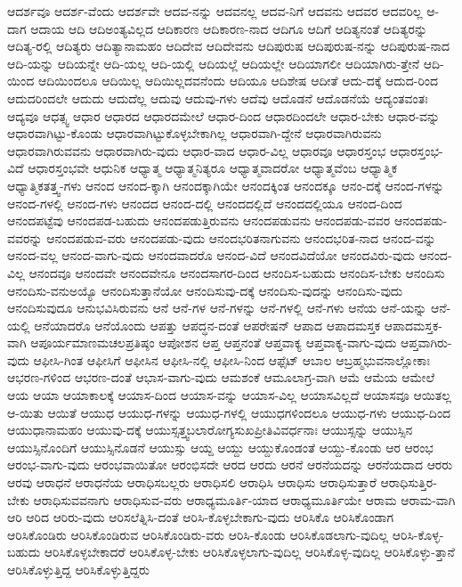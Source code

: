 {ಆದರ್ಶವೂ
ಆದರ್ಶ-ವೆಂದು
ಆದರ್ಶವೇ
ಆದವ-ನನ್ನು
ಆದವನಲ್ಲ
ಆದವ-ನಿಗೆ
ಆದವನು
ಆದವರ
ಆದವರಿಲ್ಲ
ಆ-ದಾಗ
ಆದಾಯ
ಆದಿ
ಆದಿಅಂತ್ಯವಿಲ್ಲದ
ಆದಿಕಾರಣ
ಆದಿಕಾರಣ-ನಾದ
ಆದಿಗೂ
ಆದಿಗೆ
ಆದಿತ್ಯನಂತೆ
ಆದಿತ್ಯರನ್ನು
ಆದಿತ್ಯ-ರಲ್ಲಿ
ಆದಿತ್ಯರು
ಆದಿತ್ಯಾನಾಮಹಂ
ಆದಿದೇವ
ಆದಿದೇವನು
ಆದಿಪುರುಷ
ಆದಿಪುರುಷ-ನನ್ನು
ಆದಿಪುರುಷ-ನಾದ
ಆದಿ-ಯನ್ನು
ಆದಿಯನ್ನೇ
ಆದಿ-ಯಲ್ಲ
ಆದಿ-ಯಲ್ಲಿ
ಆದಿಯಲ್ಲೆ
ಆದಿಯಲ್ಲೇ
ಆದಿಯಾಗಲೀ
ಆದಿಯಾಗಿರು-ತ್ತೇನೆ
ಆದಿ-ಯಿಂದ
ಆದಿಯಿಂದಲೂ
ಆದಿಯಿಲ್ಲ
ಆದಿಯಿಲ್ಲದವನೆಂದು
ಆದಿಯೂ
ಆದಿಶೇಷ
ಆದೀತೆ
ಆದು-ದಕ್ಕೆ
ಆದುದ-ರಿಂದ
ಆದುದರಿಂದಲೇ
ಆದುದು
ಆದುದೆಲ್ಲ
ಆದುವು
ಆದುವು-ಗಳು
ಆದೆವು
ಆದೊಡನೆ
ಆದೊಡನೆಯೆ
ಆದ್ಯಂತವಂತಃ
ಆದ್ಯವೂ
ಆಧತ್ಸ್ವ
ಆಧಾರ
ಆಧಾರದ
ಆಧಾರದಮೇಲೆ
ಆಧಾರ-ದಿಂದ
ಆಧಾರದಿಂದಲೇ
ಆಧಾರ-ಬೇಕು
ಆಧಾರ-ವನ್ನು
ಆಧಾರವಾಗಿಟ್ಟು-ಕೊಂಡು
ಆಧಾರವಾಗಿಟ್ಟುಕೊಳ್ಳಬೇಕಾಗಿಲ್ಲ
ಆಧಾರವಾಗಿ-ದ್ದೇನೆ
ಆಧಾರವಾಗಿರುವನು
ಆಧಾರವಾಗಿರುವವನು
ಆಧಾರವಾಗಿರು-ವುದು
ಆಧಾರ-ವಾದ
ಆಧಾರ-ವಿಲ್ಲ
ಆಧಾರವೂ
ಆಧಾರಸ್ತಂಭ
ಆಧಾರಸ್ತಂಭ-ವಿದೆ
ಆಧಾರಸ್ತಂಭವೇ
ಆಧುನಿಕ
ಆಧ್ಯಾತ್ಮ
ಆಧ್ಯಾತ್ಮನಿತ್ಯರೂ
ಆಧ್ಯಾತ್ಮವಾದರೋ
ಆಧ್ಯಾತ್ಮವೆಂಬ
ಆಧ್ಯಾತ್ಮಿಕ
ಆಧ್ಯಾತ್ಮಿಕತತ್ತ್ವ-ಗಳು
ಆನಂದ
ಆನಂದ-ಕ್ಕಾಗಿ
ಆನಂದಕ್ಕಾಗಿಯೇ
ಆನಂದಕ್ಕಿಂತ
ಆನಂದಕ್ಕೂ
ಆನಂ-ದಕ್ಕೆ
ಆನಂದ-ಗಳನ್ನು
ಆನಂದ-ಗಳಲ್ಲಿ
ಆನಂದ-ಗಳು
ಆನಂದದ
ಆನಂದ-ದಲ್ಲಿ
ಆನಂದದಲ್ಲಿದೆ
ಆನಂದದಲ್ಲಿಯೂ
ಆನಂದ-ದಿಂದ
ಆನಂದಪಟ್ಟೆವು
ಆನಂದಪಡ-ಬಹುದು
ಆನಂದಪಡುತ್ತಿರುವನು
ಆನಂದಪಡುವನು
ಆನಂದಪಡು-ವವರ
ಆನಂದಪಡು-ವವರನ್ನು
ಆನಂದಪಡುವ-ವರು
ಆನಂದಪಡು-ವುದು
ಆನಂದಭರಿತನಾಗುವನು
ಆನಂದಭರಿತ-ನಾದ
ಆನಂದ-ವನ್ನು
ಆನಂದ-ವಲ್ಲ
ಆನಂದ-ವಾಗು-ವುದು
ಆನಂದವಾದರೊ
ಆನಂದ-ವಿದೆ
ಆನಂದವಿದೆಯೋ
ಆನಂದವಿರು-ವುದು
ಆನಂದ-ವಿಲ್ಲ
ಆನಂದವೂ
ಆನಂದವೇ
ಆನಂದವೇನೂ
ಆನಂದಸಾಗರ-ದಿಂದ
ಆನಂದಿಸ-ಬಹುದು
ಆನಂದಿಸ-ಬೇಕು
ಆನಂದಿಸು
ಆನಂದಿಸು-ವನುಅಯ್ಯೊ
ಆನಂದಿಸುತ್ತಾನೆಯೋ
ಆನಂದಿಸುವು-ದಕ್ಕೆ
ಆನಂದಿಸು-ವುದನ್ನು
ಆನಂದಿಸು-ವುದು
ಆನಂದಿಸುವುದೂ
ಆನುಭವಿಸಿರುವನು
ಆನೆ
ಆನೆ-ಗಳ
ಆನೆ-ಗಳನ್ನು
ಆನೆ-ಗಳಲ್ಲಿ
ಆನೆ-ಗಳು
ಆನೆಯ
ಆನೆ-ಯನ್ನು
ಆನೆ-ಯಲ್ಲಿ
ಆನೆಯಾದರೊ
ಆನೆಯೊಂದು
ಆಪತ್ತು
ಆಪದ್ಧನ-ದಂತೆ
ಆಪರೇಷನ್
ಆಪಾದ
ಆಪಾದಮಸ್ತಕ
ಆಪಾದಮಸ್ತಕ-ವಾಗಿ
ಆಪೂರ್ಯಮಾಣಮಚಲಪ್ರತಿಷ್ಠಂ
ಆಪೋಶನ
ಆಪ್ತ
ಆಪ್ತನಂತೆ
ಆಪ್ತವಾಕ್ಯ
ಆಪ್ತವಾಕ್ಯ-ವಾಗು-ವುದು
ಆಪ್ತವಾಗಿರು-ವುದು
ಆಫೀಸಿ-ಗಿಂತ
ಆಫೀಸಿಗೆ
ಆಫೀಸಿನ
ಆಫೀಸಿ-ನಲ್ಲಿ
ಆಫೀಸಿ-ನಿಂದ
ಆಫ್ಸೆಟ್
ಆಬಾಲ
ಆಬ್ರಹ್ಮಭುವನಾಲ್ಲೋಕಾಃ
ಆಭರಣ-ಗಳಿಂದ
ಆಭರಣ-ದಂತೆ
ಆಭಾಸ-ವಾಗು-ವುದು
ಆಮಶಂಕೆ
ಆಮೂಲಾಗ್ರ-ವಾಗಿ
ಆಮೆ
ಆಮೆಯ
ಆಮೇಲೆ
ಆಯ
ಆಯಾ
ಆಯಾಕಾಲಕ್ಕೆ
ಆಯಾಸ-ದಿಂದ
ಆಯಾಸ-ವನ್ನು
ಆಯಾಸ-ವಿಲ್ಲ
ಆಯಾಸವಿಲ್ಲದೆ
ಆಯಾಸವೂ
ಆಯಿತಲ್ಲ
ಆ-ಯಿತು
ಆಯಿತೆ
ಆಯುಧ
ಆಯುಧ-ಗಳನ್ನು
ಆಯುಧ-ಗಳಲ್ಲಿ
ಆಯುಧಗಳಿಂದಲೂ
ಆಯುಧ-ಗಳು
ಆಯುಧ-ದಿಂದ
ಆಯುಧಾನಾಮಹಂ
ಆಯುವು-ದಕ್ಕೆ
ಆಯುಸ್ಸತ್ತ್ವಬಲಾರೋಗ್ಯಸುಖಪ್ರೀತಿವಿವರ್ಧನಾಃ
ಆಯುಸ್ಸನ್ನು
ಆಯುಸ್ಸಿನ
ಆಯುಸ್ಸಿನೊಂದಿಗೆ
ಆಯುಸ್ಸಿನೊಡನೆ
ಆಯುಸ್ಸು
ಆಯ್ದ
ಆಯ್ದು
ಆಯ್ದುಕೊಂಡಂತೆ
ಆಯ್ದು-ಕೊಂಡು
ಆರ
ಆರಂಭ
ಆರಂಭ-ವಾಗು-ವುದು
ಆರಂಭವಾಯಿತೋ
ಆರಂಭಿಸದೇ
ಆರದ
ಆರದು
ಆರನೆ
ಆರನೆಯದನ್ನು
ಆರನೆಯದಾದ
ಆರರು
ಆರವು
ಆರಾಧನೆ
ಆರಾಧನೆಯ
ಆರಾಧಿಸಬಲ್ಲರು
ಆರಾಧಿಸಲಿ
ಆರಾಧಿಸಿ
ಆರಾಧಿಸು
ಆರಾಧಿಸುತ್ತಾರೆ
ಆರಾಧಿಸುತ್ತಿರ-ಬೇಕು
ಆರಾಧಿಸುವವನಾಗು
ಆರಾಧಿಸುವ-ವರು
ಆರಾಧ್ಯಮೂರ್ತಿ-ಯಾದ
ಆರಾಧ್ಯಮೂರ್ತಿಯೇ
ಆರಾಮ
ಆರಾಮ-ವಾಗಿ
ಆರಿ
ಆರಿದ
ಆರಿರು-ವುದು
ಆರಿಸಲೆತ್ನಿಸಿ-ದಂತೆ
ಆರಿಸಿ-ಕೊಳ್ಳಬೇಕಾಗು-ವುದು
ಆರಿಸಿಕೊ
ಆರಿಸಿಕೊಂಡಾಗ
ಆರಿಸಿಕೊಂಡಿರು
ಆರಿಸಿಕೊಂಡಿರುವ
ಆರಿಸಿಕೊಂಡಿರು-ವರು
ಆರಿಸಿ-ಕೊಂಡು
ಆರಿಸಿಕೊಡಲಾಗು-ವುದಿಲ್ಲ
ಆರಿಸಿ-ಕೊಳ್ಳ-ಬಹುದು
ಆರಿಸಿಕೊಳ್ಳಬೇಕಾದರೆ
ಆರಿಸಿಕೊಳ್ಳ-ಬೇಕು
ಆರಿಸಿಕೊಳ್ಳಲಾಗು-ವುದಿಲ್ಲ
ಆರಿಸಿಕೊಳ್ಳ-ವುದಿಲ್ಲ
ಆರಿಸಿಕೊಳ್ಳು-ತ್ತಾನೆ
ಆರಿಸಿಕೊಳ್ಳುತ್ತಿದ್ದ
ಆರಿಸಿಕೊಳ್ಳುತ್ತಿದ್ದರು
}
